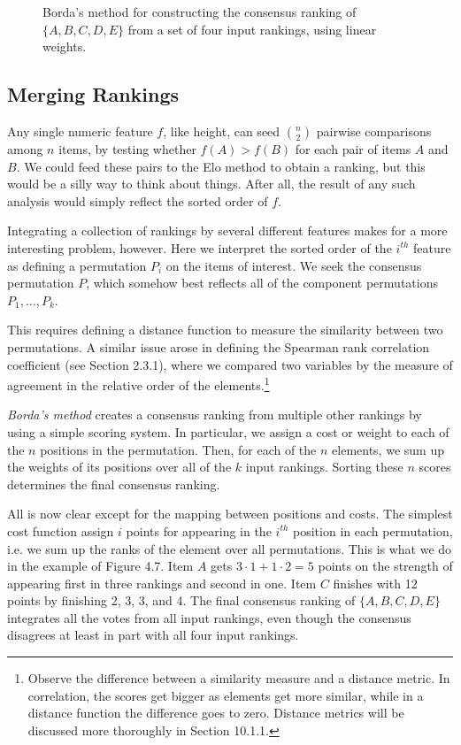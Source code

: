 \documentclass[10pt]{article}
\begin{document}
\begin{figure}[h!]
    \centering
    \caption{Borda’s method for constructing the consensus ranking of $\{A, B, C, D, E\}$ from a set of four input rankings, using linear weights.}
\end{figure}

\subsection*{Merging Rankings}
Any single numeric feature $f$, like height, can seed \(\binom{n}{2}\) pairwise comparisons among $n$ items, by testing whether $f(A) > f(B)$ for each pair of items $A$ and $B$. We could feed these pairs to the Elo method to obtain a ranking, but this would be a silly way to think about things. After all, the result of any such analysis would simply reflect the sorted order of $f$.

Integrating a collection of rankings by several different features makes for a more interesting problem, however. Here we interpret the sorted order of the $i^{th}$ feature as defining a permutation $P_i$ on the items of interest. We seek the consensus permutation $P$, which somehow best reflects all of the component permutations $P_1, \ldots, P_k$.

This requires defining a distance function to measure the similarity between two permutations. A similar issue arose in defining the Spearman rank correlation coefficient (see Section 2.3.1), where we compared two variables by the measure of agreement in the relative order of the elements.\footnote{Observe the difference between a similarity measure and a distance metric. In correlation, the scores get bigger as elements get more similar, while in a distance function the difference goes to zero. Distance metrics will be discussed more thoroughly in Section 10.1.1.}

\textit{Borda’s method} creates a consensus ranking from multiple other rankings by using a simple scoring system. In particular, we assign a cost or weight to each of the $n$ positions in the permutation. Then, for each of the $n$ elements, we sum up the weights of its positions over all of the $k$ input rankings. Sorting these $n$ scores determines the final consensus ranking.

All is now clear except for the mapping between positions and costs. The simplest cost function assign $i$ points for appearing in the $i^{th}$ position in each permutation, i.e. we sum up the ranks of the element over all permutations. This is what we do in the example of Figure 4.7. Item $A$ gets $3 \cdot 1 + 1 \cdot 2 = 5$ points on the strength of appearing first in three rankings and second in one. Item $C$ finishes with 12 points by finishing 2, 3, 3, and 4. The final consensus ranking of $\{A, B, C, D, E\}$ integrates all the votes from all input rankings, even though the consensus disagrees at least in part with all four input rankings.
\end{document}
